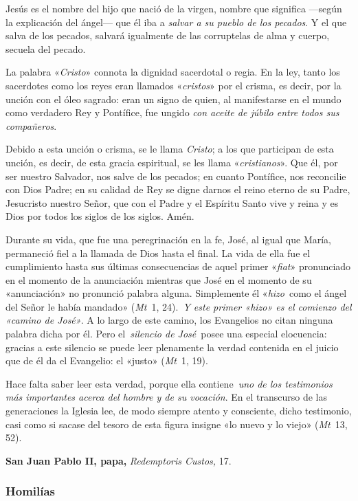 \documentclass[]{article}
\begin{document}
Jesús es el nombre del hijo que nació de la virgen, nombre que significa
---según la explicación del ángel--- que él iba a \emph{salvar a su
pueblo de los pecados}. Y el que salva de los pecados, salvará
igualmente de las corruptelas de alma y cuerpo, secuela del pecado.

La palabra «\emph{Cristo}» connota la dignidad sacerdotal o regia. En la
ley, tanto los sacerdotes como los reyes eran llamados «\emph{cristos}»
por el crisma, es decir, por la unción con el óleo sagrado: eran un
signo de quien, al manifestarse en el mundo como verdadero Rey y
Pontífice, fue ungido \emph{con aceite de júbilo entre todos sus
compañeros}.

Debido a esta unción o crisma, se le llama \emph{Cristo}; a los que
participan de esta unción, es decir, de esta gracia espiritual, se les
llama «\emph{cristianos}». Que él, por ser nuestro Salvador, nos salve
de los pecados; en cuanto Pontífice, nos reconcilie con Dios Padre; en
su calidad de Rey se digne darnos el reino eterno de su Padre,
Jesucristo nuestro Señor, que con el Padre y el Espíritu Santo vive y
reina y es Dios por todos los siglos de los siglos. Amén.

Durante su vida, que fue una peregrinación en la fe, José, al igual que
María, permaneció fiel a la llamada de Dios hasta el final. La vida de
ella fue el cumplimiento hasta sus últimas consecuencias de aquel primer
«\emph{fiat}» pronunciado en el momento de la anunciación mientras que
José en el momento de su «anunciación» no pronunció palabra alguna.
Simplemente él «\emph{hizo}~como el ángel del Señor le había mandado»
(\emph{Mt}~1, 24).~\emph{Y este primer «hizo» es el comienzo del «camino
de José»}. A lo largo de este camino, los Evangelios no citan ninguna
palabra dicha por él. Pero el~\emph{silencio de José}~posee una especial
elocuencia: gracias a este silencio se puede leer plenamente la verdad
contenida en el juicio que de él da el Evangelio: el «justo»
(\emph{Mt}~1, 19).~

Hace falta saber leer esta verdad, porque ella contiene~\emph{uno de los
testimonios más importantes acerca del hombre y de su vocación}. En el
transcurso de las generaciones la Iglesia lee, de modo siempre atento y
consciente, dicho testimonio, casi como si sacase del tesoro de esta
figura insigne «lo nuevo y lo viejo» (\emph{Mt}~13, 52).~

\textbf{San Juan Pablo II, papa,} \emph{Redemptoris Custos,} 17.



\subsubsection{Homilías}\label{homiluxedas-3}
\end{document}
